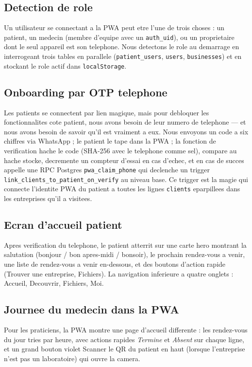 \subsection{Detection de role}
Un utilisateur se connectant a la PWA peut etre l'une de trois choses :
un patient, un medecin (membre d'equipe avec un \texttt{auth\_uid}), ou
un proprietaire dont le seul appareil est son telephone. Nous detectons
le role au demarrage en interrogeant trois tables en parallele
(\texttt{patient\_users}, \texttt{users}, \texttt{businesses}) et en
stockant le role actif dans \texttt{localStorage}.

\subsection{Onboarding par OTP telephone}
Les patients se connectent par lien magique, mais pour debloquer les
fonctionnalites cote patient, nous avons besoin de leur numero de
telephone --- et nous avons besoin de savoir qu'il est vraiment a eux.
Nous envoyons un code a six chiffres via WhatsApp ; le patient le tape
dans la PWA ; la fonction de verification hache le code (SHA-256 avec
le telephone comme sel), compare au hache stocke, decremente un
compteur d'essai en cas d'echec, et en cas de succes appelle une RPC
Postgres \texttt{pwa\_claim\_phone} qui declenche un trigger
\texttt{link\_clients\_to\_patient\_on\_verify} au niveau base. Ce
trigger est la magie qui connecte l'identite PWA du patient a toutes
les lignes \texttt{clients} eparpillees dans les entreprises qu'il a
visitees.

\subsection{Ecran d'accueil patient}
Apres verification du telephone, le patient atterrit sur une carte hero
montrant la salutation (bonjour / bon apres-midi / bonsoir), le
prochain rendez-vous a venir, une liste de rendez-vous a venir
en-dessous, et des boutons d'action rapide (Trouver une entreprise,
Fichiers). La navigation inferieure a quatre onglets : Accueil,
Decouvrir, Fichiers, Moi.

\subsection{Journee du medecin dans la PWA}
Pour les praticiens, la PWA montre une page d'accueil differente :
les rendez-vous du jour tries par heure, avec actions rapides
\emph{Termine} et \emph{Absent} sur chaque ligne, et un grand bouton
violet \og Scanner le QR du patient \fg{} en haut (lorsque l'entreprise
n'est pas un laboratoire) qui ouvre la camera.

